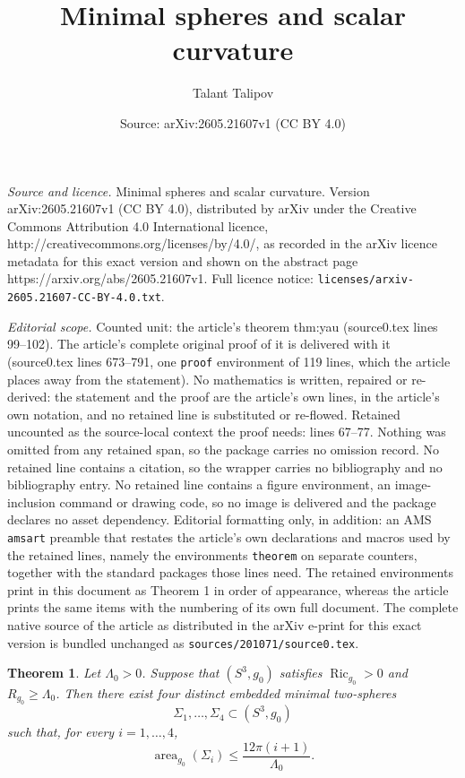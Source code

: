 \documentclass[10pt,a4paper]{amsart}
\title{Minimal spheres and scalar curvature}
\author{Talant Talipov}
\date{Source: arXiv:2605.21607v1 (CC BY 4.0)}
\newtheorem{theorem}{Theorem}
\begin{document}
\maketitle

\noindent\emph{Source and licence.} Minimal spheres and scalar curvature. Version arXiv:2605.21607v1 (CC BY 4.0), distributed by arXiv under the Creative Commons Attribution 4.0 International licence, http://creativecommons.org/licenses/by/4.0/, as recorded in the arXiv licence metadata for this exact version and shown on the abstract page https://arxiv.org/abs/2605.21607v1. Full licence notice: \texttt{licenses/arxiv-2605.21607-CC-BY-4.0.txt}.\par\smallskip

\noindent\textit{Editorial scope.} Counted unit: the article's theorem thm:yau (source0.tex lines 99--102). The article's complete original proof of it is delivered with it (source0.tex lines 673--791, one \texttt{proof} environment of 119 lines, which the article places away from the statement). No mathematics is written, repaired or re-derived: the statement and the proof are the article's own lines, in the article's own notation, and no retained line is substituted or re-flowed.  Retained uncounted as the source-local context the proof needs: lines 67--77.  Nothing was omitted from any retained span, so the package carries no omission record.  No retained line contains a citation, so the wrapper carries no bibliography and no bibliography entry.  No retained line contains a figure environment, an image-inclusion command or drawing code, so no image is delivered and the package declares no asset dependency.  Editorial formatting only, in addition: an AMS \texttt{amsart} preamble that restates the article's own declarations and macros used by the retained lines, namely the environments \texttt{theorem} on separate counters, together with the standard packages those lines need.  The retained environments print in this document as Theorem 1 in order of appearance, whereas the article prints the same items with the numbering of its own full document.  The complete native source of the article as distributed in the arXiv e-print for this exact version is bundled unchanged as \texttt{sources/201071/source0.tex}.
\begin{theorem}
\label{thm:main}
    Let \(\Lambda_0>0\). Suppose that \((S^3,g_0)\) satisfies \(\operatorname{Ric}_{g_0}>0\) and \(R_{g_0}\ge \Lambda_0\). Then there exist four distinct embedded minimal two-spheres
    \[
    \Sigma_1,\ldots,\Sigma_4 \subset (S^3,g_0)
    \]
    such that, for every \(i=1,\ldots,4\),
    \[
    \operatorname{area}_{g_0}(\Sigma_i)\le \frac{12\pi(i+1)}{\Lambda_0}.
    \]
\end{theorem}
\end{document}
